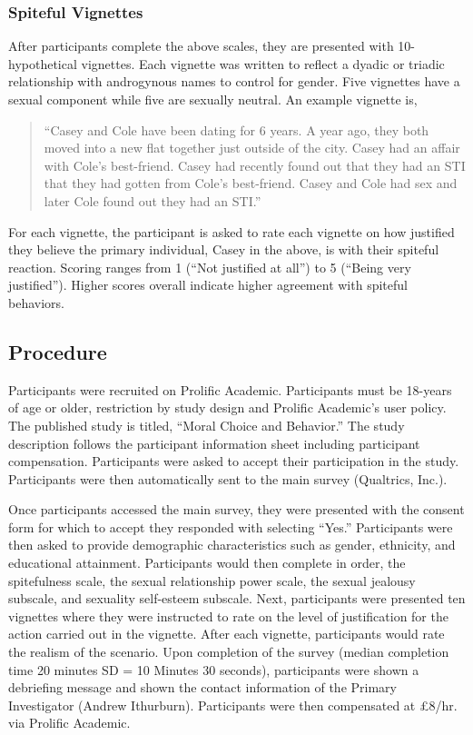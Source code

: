 \documentclass[
  english,
  a4paper,floatsintext]{apa7}
\begin{document}
\hypertarget{spiteful-vignettes}{%
\subsubsection{Spiteful Vignettes}\label{spiteful-vignettes}}

After participants complete the above scales, they are presented with 10-hypothetical vignettes. Each vignette was written to reflect a dyadic or triadic relationship with androgynous names to control for gender. Five vignettes have a sexual component while five are sexually neutral. An example vignette is,

\begin{quote}
``Casey and Cole have been dating for 6 years. A year ago, they both moved into a new flat together just outside of the city. Casey had an affair with Cole's best-friend. Casey had recently found out that they had an STI that they had gotten from Cole's best-friend. Casey and Cole had sex and later Cole found out they had an STI.''
\end{quote}

For each vignette, the participant is asked to rate each vignette on how justified they believe the primary individual, Casey in the above, is with their spiteful reaction. Scoring ranges from 1 (``Not justified at all'') to 5 (``Being very justified''). Higher scores overall indicate higher agreement with spiteful behaviors.

\hypertarget{procedure}{%
\subsection{Procedure}\label{procedure}}

Participants were recruited on Prolific Academic. Participants must be 18-years of age or older, restriction by study design and Prolific Academic's user policy. The published study is titled, ``Moral Choice and Behavior.'' The study description follows the participant information sheet including participant compensation. Participants were asked to accept their participation in the study. Participants were then automatically sent to the main survey (Qualtrics, Inc.).

Once participants accessed the main survey, they were presented with the consent form for which to accept they responded with selecting ``Yes.'' Participants were then asked to provide demographic characteristics such as gender, ethnicity, and educational attainment. Participants would then complete in order, the spitefulness scale, the sexual relationship power scale, the sexual jealousy subscale, and sexuality self-esteem subscale. Next, participants were presented ten vignettes where they were instructed to rate on the level of justification for the action carried out in the vignette. After each vignette, participants would rate the realism of the scenario. Upon completion of the survey (median completion time 20 minutes SD = 10 Minutes 30 seconds), participants were shown a debriefing message and shown the contact information of the Primary Investigator (Andrew Ithurburn). Participants were then compensated at £8/hr. via Prolific Academic.
\end{document}
